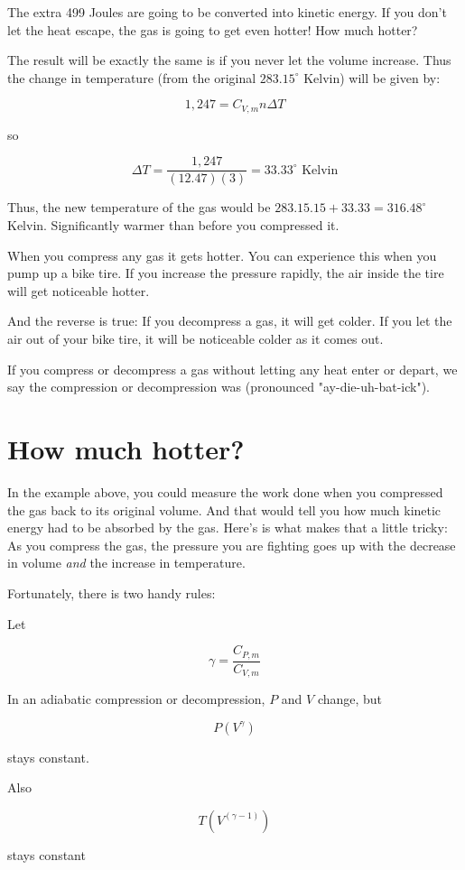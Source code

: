 The extra 499 Joules are going to be converted into kinetic energy.  If you don't let the heat escape, the gas is going to get even hotter!  How much hotter?

The result will be exactly the same is if you never let the volume increase.  Thus the change in temperature (from the original $283.15^\circ$ Kelvin) will be given by:

$$1,247 = C_{V,m} n \Delta T$$

so 

$$\Delta T = \frac{1,247}{(12.47)(3)} = 33.33^\circ \text{ Kelvin}$$

Thus, the new temperature of the gas would be $283.15.15 + 33.33 = 316.48^\circ$ Kelvin.  Significantly warmer than before you compressed it.

When you compress any gas it gets hotter.  You can experience this when you pump up a bike tire.  If you increase the pressure rapidly,  the air inside the tire will get noticeable hotter.

And the reverse is true: If you decompress a gas,  it will get colder.  If you let the air out of your bike tire,  it will be noticeable colder as it comes out.

If you compress or decompress a gas without letting any heat enter or depart,  we say the compression or decompression was  (pronounced "ay-die-uh-bat-ick").

\section{How much hotter?}

In the example above,   you could measure the work done when you compressed the gas back to its original volume.  And that would tell you how much kinetic energy had to be absorbed by the gas.   Here's is what makes that a little tricky:  As you compress the gas,  the pressure you are fighting goes up with the decrease in volume \emph{and} the increase in temperature.

Fortunately,  there is two handy rules:

\begin{mdframed}[style=important, frametitle={Adiabatic Compression and Decompression}]

Let 

$$\gamma = \frac{C_{P,m}}{C_{V,m}}$$

In an adiabatic compression or decompression,  $P$ and $V$ change,  but

$$P \left(V^\gamma \right)$$

stays constant.

Also 

$$T \left(V^{\left( \gamma - 1 \right)} \right)$$

stays constant

\end{mdframed}

